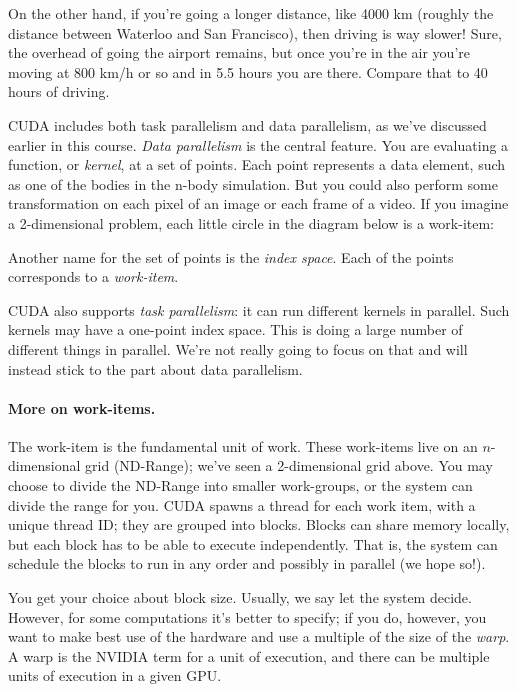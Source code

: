 \documentclass[a4paper]{report}
\begin{document}
On the other hand, if you're going a longer distance, like 4000 km (roughly the distance between Waterloo and San Francisco), then driving is way slower! Sure, the overhead of going the airport remains, but once you're in the air you're moving at 800 km/h or so and in 5.5 hours you are there. Compare that to 40 hours of driving.

CUDA includes both task parallelism and data parallelism, as we've
discussed earlier in this course. \emph{Data parallelism} is the central
feature. You are evaluating a function, or \emph{kernel},
at a set of points. Each point represents a data element, such as one of the
bodies in the n-body simulation. But you could also perform some 
transformation on each pixel of an image or each frame of a video. If you 
imagine a 2-dimensional problem, each little circle in the diagram below is
a work-item:

\begin{center}
\end{center}

Another name for the set of points is the \emph{index space}. 
Each of the points corresponds to a \emph{work-item}.

CUDA also supports \emph{task parallelism}: it can run different
kernels in parallel. Such kernels may have a one-point index space. This is
doing a large number of different things in parallel. We're not really going
to focus on that and will instead stick to the part about data parallelism.

\paragraph{More on work-items.} The work-item is the fundamental
unit of work. These work-items live on an $n$-dimensional
grid (ND-Range); we've seen a 2-dimensional grid above. You may choose
to divide the ND-Range into smaller work-groups, or the system can
divide the range for you. CUDA spawns a thread for each work item,
with a unique thread ID; they are grouped into blocks. Blocks can share 
memory locally, but each block has to be able to execute independently.
That is, the system can schedule the blocks to run in any order and possibly
in parallel (we hope so!). 

You get your choice about block size. Usually, we say let the system decide. However, for some computations it's better to specify; if you do, however, you want to make best use of the hardware and use a multiple of the size of the \textit{warp}. A warp is the NVIDIA term for a unit of execution, and there can be multiple units of execution in a given GPU.
\end{document}
